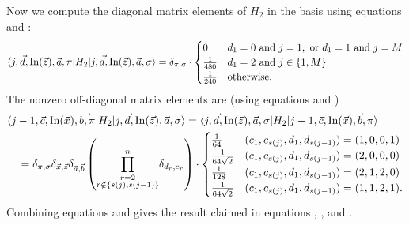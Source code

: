 \documentclass[../thesis-main/thesis-main]{subfiles}
\begin{document}
Now we compute the diagonal matrix elements of $H_{2}$ in the basis  using equations  and :
\begin{equation}
\langle j,\vec{d},\operatorname{In}(\vec{z}),\vec{a},\pi|H_{2}|j,\vec{d},\operatorname{In}(\vec{z}),\vec{a},\sigma\rangle=\delta_{\pi,\sigma} \cdot \begin{cases}
0 & d_{1}=0\text{ and }j=1,\text{ or }d_{1}=1\text{ and }j=M\\
\frac{1}{480} & d_{1}=2\text{ and }j\in\{1,M\}\\
\frac{1}{240} & \text{otherwise.}
\end{cases}\label{eq:H2_diag_goodbasis}
\end{equation}
The nonzero off-diagonal matrix elements are (using equations  and )
\begin{align}
&\langle j-1,\vec{c},\operatorname{In}(\vec{x}),\vec{b,\pi}|H_{2}|j,\vec{d},\operatorname{In}(\vec{z}),\vec{a},\sigma\rangle
= \langle j,\vec{d},\operatorname{In}(\vec{z}),\vec{a},\sigma|H_{2}|j-1,\vec{c},\operatorname{In}(\vec{x}),\vec{b},\pi\rangle \nonumber\\
&\quad=\delta_{\pi,\sigma}\delta_{\vec{x},\vec{z}}\delta_{\vec{a},\vec{b}}\left(\underset{\substack{r=2\\
r\notin\{s(j),s(j-1)\}
}
}{\overset{n}{\prod}}\delta_{d_{r},c_{r}}\right)\cdot\begin{cases}
\frac{1}{64} & (c_{1},c_{s(j)},d_{1},d_{s(j-1)})=(1,0,0,1)\\
\frac{1}{64\sqrt{2}} & (c_{1},c_{s(j)},d_{1},d_{s(j-1)})=(2,0,0,0)\\
\frac{1}{128} & (c_{1},c_{s(j)},d_{1},d_{s(j-1)})=(2,1,2,0)\\
\frac{1}{64\sqrt{2}} & (c_{1},c_{s(j)},d_{1},d_{s(j-1)})=(1,1,2,1).
\end{cases}\label{eq:H2_offdiag_goodbasis}
\end{align}
Combining equations  and  gives the result claimed in equations , , and .
\end{document}
